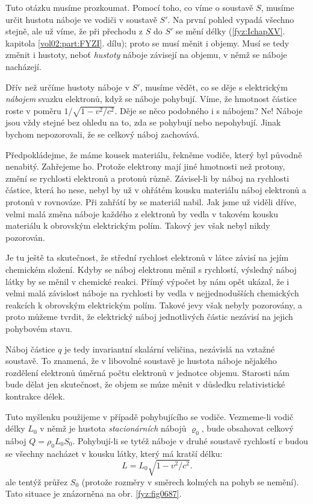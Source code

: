     Tuto otázku musíme prozkoumat. Pomocí toho, co víme o soustavě \(S\), musíme určit hustotu
    náboje ve vodiči v soustavě \(S'\). Na první pohled vypadá všechno stejně, ale už víme, že při
    přechodu z \(S\) do \(S'\) se mění délky (\ref{fyz:IchapXV}. kapitola \ref{vol02:part:FYZI}. dílu);
    proto se musí měnit i objemy. Musí se tedy změnit i hustoty, neboť \emph{hustoty} náboje
    závisejí na objemu, v němž se náboje nacházejí.

    Dřív než určíme hustoty náboje v \(S'\), musíme vědět, co se děje s elektrickým \emph{nábojem}
    svazku elektronů, když se náboje pohybují. Víme, že hmotnost částice roste v poměru \(1/\sqrt{1
    - v^2/c^2}\).  Děje se něco podobného i s nábojem? Ne! Náboje jsou vždy stejné bez ohledu na to,
    zda se pohybují nebo nepohybují. Jinak bychom nepozorovali, že se celkový náboj zachovává.

    Předpokládejme, že máme kousek materiálu, řekněme vodiče, který byl původně nenabitý. 
    Zahřejeme ho. Protože elektrony mají jiné hmotnosti než protony, změní se rychlosti elektronů a
    protonů různě. Závisel-li by náboj na rychlosti částice, která ho nese, nebyl by už v ohřátém
    kousku materiálu náboj elektronů a protonů v rovnováze. Při zahřátí by se materiál nabil. Jak
    jsme už viděli dříve, velmi malá změna náboje každého z elektronů by vedla v takovém kousku
    materiálu k obrovským elektrickým polím. Takový jev však nebyl nikdy pozorován.

    Je tu ještě ta skutečnost, že střední rychlost elektronů v látce závisí na jejím chemickém
    složení. Kdyby se náboj elektronu měnil s rychlostí, výsledný náboj látky by se měnil v chemické
    reakci. Přímý výpočet by nám opět ukázal, že i velmi malá závislost náboje na rychlosti by vedla
    v nejjednodušších chemických reakcích k obrovským elektrickým polím. Takové jevy však nebyly
    pozorovány, a proto můžeme tvrdit, že elektrický náboj jednotlivých částic nezávisí na jejich
    pohybovém stavu.

    Náboj částice \(q\) je tedy invariantní skalární veličina, nezávislá na vztažné soustavě. To
    znamená, že v libovolné soustavě je hustota náboje nějakého rozdělení elektronů úměrná počtu
    elektronů v jednotce objemu. Starosti nám bude dělat jen skutečnost, že objem se múze měnit v
    důsledku relativistické kontrakce délek.

    Tuto myšlenku použijeme v případě pohybujícího se vodiče. Vezmeme-li vodič délky \(L_0\) v němž
    je hustota \emph{stacionárních} nábojů \(\varrho_0\), bude obsahovat celkový náboj
    \(Q=ρ_0L_0S_0\). Pohybují-li se tytéž náboje v druhé soustavě rychlostí \(v\) budou se všechny
    nacházet v kousku látky, který má kratší délku:
    \begin{equation}\label{fyz:eq811}
      L=L_0\sqrt{1−v^2/c^2}.
    \end{equation}
    ale tentýž průřez \(S_0\) (protože rozměry v směrech kolmých na pohyb se nemění). Tato situace je
    znázorněna na obr. \ref{fyz:fig0687}.

